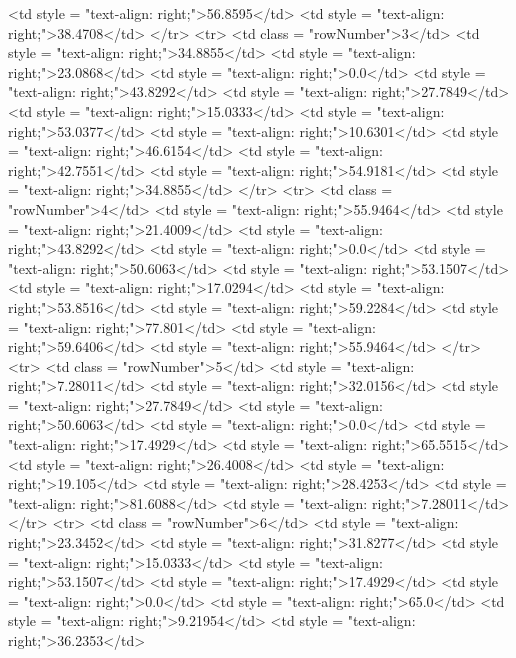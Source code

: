 \documentclass[12pt,a4paper]{article}
\begin{document}
      <td style = "text-align: right;">56.8595</td>
      <td style = "text-align: right;">38.4708</td>
    </tr>
    <tr>
      <td class = "rowNumber">3</td>
      <td style = "text-align: right;">34.8855</td>
      <td style = "text-align: right;">23.0868</td>
      <td style = "text-align: right;">0.0</td>
      <td style = "text-align: right;">43.8292</td>
      <td style = "text-align: right;">27.7849</td>
      <td style = "text-align: right;">15.0333</td>
      <td style = "text-align: right;">53.0377</td>
      <td style = "text-align: right;">10.6301</td>
      <td style = "text-align: right;">46.6154</td>
      <td style = "text-align: right;">42.7551</td>
      <td style = "text-align: right;">54.9181</td>
      <td style = "text-align: right;">34.8855</td>
    </tr>
    <tr>
      <td class = "rowNumber">4</td>
      <td style = "text-align: right;">55.9464</td>
      <td style = "text-align: right;">21.4009</td>
      <td style = "text-align: right;">43.8292</td>
      <td style = "text-align: right;">0.0</td>
      <td style = "text-align: right;">50.6063</td>
      <td style = "text-align: right;">53.1507</td>
      <td style = "text-align: right;">17.0294</td>
      <td style = "text-align: right;">53.8516</td>
      <td style = "text-align: right;">59.2284</td>
      <td style = "text-align: right;">77.801</td>
      <td style = "text-align: right;">59.6406</td>
      <td style = "text-align: right;">55.9464</td>
    </tr>
    <tr>
      <td class = "rowNumber">5</td>
      <td style = "text-align: right;">7.28011</td>
      <td style = "text-align: right;">32.0156</td>
      <td style = "text-align: right;">27.7849</td>
      <td style = "text-align: right;">50.6063</td>
      <td style = "text-align: right;">0.0</td>
      <td style = "text-align: right;">17.4929</td>
      <td style = "text-align: right;">65.5515</td>
      <td style = "text-align: right;">26.4008</td>
      <td style = "text-align: right;">19.105</td>
      <td style = "text-align: right;">28.4253</td>
      <td style = "text-align: right;">81.6088</td>
      <td style = "text-align: right;">7.28011</td>
    </tr>
    <tr>
      <td class = "rowNumber">6</td>
      <td style = "text-align: right;">23.3452</td>
      <td style = "text-align: right;">31.8277</td>
      <td style = "text-align: right;">15.0333</td>
      <td style = "text-align: right;">53.1507</td>
      <td style = "text-align: right;">17.4929</td>
      <td style = "text-align: right;">0.0</td>
      <td style = "text-align: right;">65.0</td>
      <td style = "text-align: right;">9.21954</td>
      <td style = "text-align: right;">36.2353</td>
\end{document}
